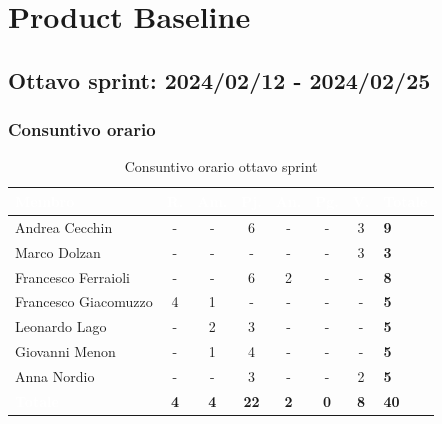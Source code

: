 \newpage

\section{Product Baseline}
\subsection{Ottavo sprint: 2024/02/12 - 2024/02/25}
\subsubsection{Consuntivo orario}
{
\setlength{\tabcolsep}{10pt}
\renewcommand{\arraystretch}{1.5}
\begin{table}[h!]
    \centering
    \begin{tabularx}{\textwidth}{| l | c | c | c | c | c | c | X |}
        \hline
        \rowcolor{headerrow} \textbf{\textcolor{white}{Membro}} & \textbf{\textcolor{white}{R.}} & \textbf{\textcolor{white}{Am.}} & \textbf{\textcolor{white}{Pj.}} & \textbf{\textcolor{white}{An.}} & \textbf{\textcolor{white}{Pg.}} & \textbf{\textcolor{white}{V.}} & \textbf{\textcolor{white}{Totale}} \\
        \hline
        Andrea Cecchin & - & -  & 6 & - & - & 3 & \textbf{9} \\
        \hline
        Marco Dolzan & - & - & - & - & - & 3 & \textbf{3} \\
        \hline
        Francesco Ferraioli & - & - & 6 & 2 & - & - & \textbf{8} \\
        \hline  
        Francesco Giacomuzzo & 4 & 1 & - & - & - & - & \textbf{5} \\
        \hline
        Leonardo Lago & - & 2 & 3 & - & - & - & \textbf{5} \\
        \hline
        Giovanni Menon & - & 1 & 4 & - & - & - & \textbf{5} \\
        \hline
        Anna Nordio & - & - & 3 & - & - & 2 & \textbf{5} \\
        \hline
    \cellcolor{headerrow} \textbf{\textcolor{white}{Totale}} & \textbf{4} & \textbf{4} & \textbf{22} & \textbf{2} & \textbf{0} & \textbf{8} & \textbf{40} \\
        \hline
    \end{tabularx} 
    \caption{Consuntivo orario ottavo sprint}
    \label{tab:consuntivoorarioottavosprint}
\end{table}
}

